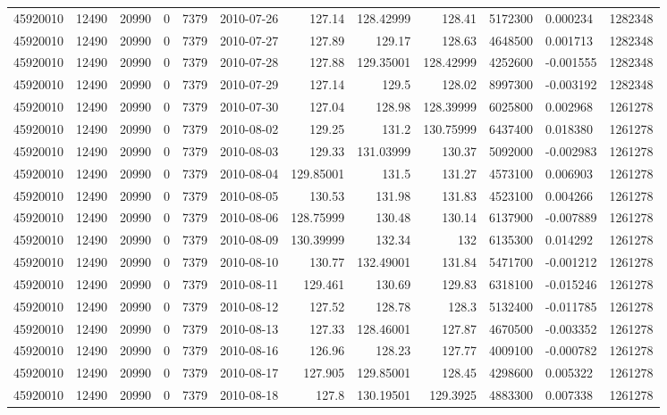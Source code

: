 \begin{tabular}{l | r | r | r | r | l | r | r | r | r | l | r}
45920010 & 12490 & 20990 & 0 & 7379 & 2010-07-26 & 127.14 & 128.42999 & 128.41 & 5172300 & 0.000234 & 1282348 \\
45920010 & 12490 & 20990 & 0 & 7379 & 2010-07-27 & 127.89 & 129.17 & 128.63 & 4648500 & 0.001713 & 1282348 \\
45920010 & 12490 & 20990 & 0 & 7379 & 2010-07-28 & 127.88 & 129.35001 & 128.42999 & 4252600 & -0.001555 & 1282348 \\
45920010 & 12490 & 20990 & 0 & 7379 & 2010-07-29 & 127.14 & 129.5 & 128.02 & 8997300 & -0.003192 & 1282348 \\
45920010 & 12490 & 20990 & 0 & 7379 & 2010-07-30 & 127.04 & 128.98 & 128.39999 & 6025800 & 0.002968 & 1261278 \\
45920010 & 12490 & 20990 & 0 & 7379 & 2010-08-02 & 129.25 & 131.2 & 130.75999 & 6437400 & 0.018380 & 1261278 \\
45920010 & 12490 & 20990 & 0 & 7379 & 2010-08-03 & 129.33 & 131.03999 & 130.37 & 5092000 & -0.002983 & 1261278 \\
45920010 & 12490 & 20990 & 0 & 7379 & 2010-08-04 & 129.85001 & 131.5 & 131.27 & 4573100 & 0.006903 & 1261278 \\
45920010 & 12490 & 20990 & 0 & 7379 & 2010-08-05 & 130.53 & 131.98 & 131.83 & 4523100 & 0.004266 & 1261278 \\
45920010 & 12490 & 20990 & 0 & 7379 & 2010-08-06 & 128.75999 & 130.48 & 130.14 & 6137900 & -0.007889 & 1261278 \\
45920010 & 12490 & 20990 & 0 & 7379 & 2010-08-09 & 130.39999 & 132.34 & 132 & 6135300 & 0.014292 & 1261278 \\
45920010 & 12490 & 20990 & 0 & 7379 & 2010-08-10 & 130.77 & 132.49001 & 131.84 & 5471700 & -0.001212 & 1261278 \\
45920010 & 12490 & 20990 & 0 & 7379 & 2010-08-11 & 129.461 & 130.69 & 129.83 & 6318100 & -0.015246 & 1261278 \\
45920010 & 12490 & 20990 & 0 & 7379 & 2010-08-12 & 127.52 & 128.78 & 128.3 & 5132400 & -0.011785 & 1261278 \\
45920010 & 12490 & 20990 & 0 & 7379 & 2010-08-13 & 127.33 & 128.46001 & 127.87 & 4670500 & -0.003352 & 1261278 \\
45920010 & 12490 & 20990 & 0 & 7379 & 2010-08-16 & 126.96 & 128.23 & 127.77 & 4009100 & -0.000782 & 1261278 \\
45920010 & 12490 & 20990 & 0 & 7379 & 2010-08-17 & 127.905 & 129.85001 & 128.45 & 4298600 & 0.005322 & 1261278 \\
45920010 & 12490 & 20990 & 0 & 7379 & 2010-08-18 & 127.8 & 130.19501 & 129.3925 & 4883300 & 0.007338 & 1261278 \\

\end{tabular}
